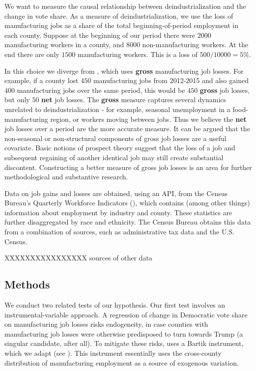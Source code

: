 \documentclass[]{AEA}
\begin{document}
We want to measure the causal relationship between deindustrialization
and the change in vote share. As a measure of deindustrialization, we
use the loss of manufacturing jobs as a share of the total
beginning-of-period employment in each county. Suppose at the beginning
of our period there were \(2000\) manufacturing workers in a county, and
\(8000\) non-manufacturing workers. At the end there are only \(1500\)
manufacturing workers. This is a loss of \(500/10000 = 5\%.\)

In this choice we diverge from \cite{Baccini21}, which uses
\textbf{gross} manufacturing job losses. For example, if a county lost
\(450\) manufacturing jobs from 2012-2015 and also gained \(400\)
manufacturing jobs over the same period, this would be \(450\)
\textbf{gross} job losses, but only \(50\) \textbf{net} job losses. The
\textbf{gross} measure captures several dynamics unrelated to
deindustrialization - for example, seasonal unemployment in a
food-manufacturing region, or workers moving between jobs. Thus we
believe the \textbf{net} job losses over a period are the more accurate
measure. It can be argued that the non-seasonal or non-structural
components of gross job losses are a useful covariate. Basic notions of
prospect theory suggest that the loss of a job and subsequent regaining
of another identical job may still create substantial discontent.
Constructing a better measure of gross job losses is an area for further
methodological and substantive research.

Data on job gains and losses are obtained, using an API, from the Census
Bureau's Quarterly Workforce Indicators (\cite{QWI}), which contains
(among other things) information about employment by industry and
county. These statistics are further disaggregated by race and
ethnicity. The Census Bureau obtains this data from a combination of
sources, such as administrative tax data and the U.S. Census.

XXXXXXXXXXXXXXXX sources of other data

\subsection{Methods} 
\label{methodssec}

We conduct two related tests of our hypothesis. Our first test involves
an instrumental-variable approach. A regression of change in Democratic
vote share on manufacturing job losses risks endogeneity, in case
counties with manufacturing job losses were otherwise predisposed to
turn towards Trump (a singular candidate, after all). To mitigate these
risks, \cite{Baccini21} uses a Bartik instrument, which we adapt (see
\cite{Bartik91}). This instrument essentially uses the cross-county
distribution of manufacturing employment as a source of exogenous
variation.
\end{document}
